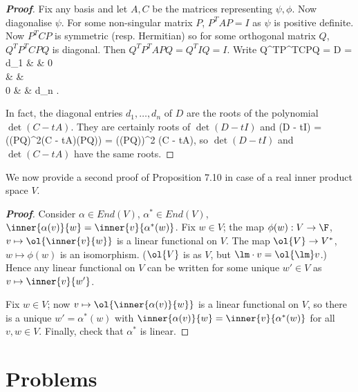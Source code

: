 \begin{proof}[\bf Proof]
Fix any basis and let $A,C$ be the matrices representing $\psi, \phi$. Now diagonalise $\psi$. For some non-singular matrix $P$, $P^TAP = I$ as $\psi$ is positive definite. Now $P^TCP$ is symmetric (resp. Hermitian) so for some orthogonal matrix $Q$, $Q^TP^TCPQ$ is diagonal. Then $Q^TP^TAPQ = Q^T IQ = I$. Write
\be
Q^TP^TCPQ = D = \bepm
d_1 & & 0\\
& \ddots &\\
0 & & d_n
\eepm.
\ee

In fact, the diagonal entries $d_1, \dots, d_n$ of $D$ are the roots of the polynomial $\det(C -tA)$. They are certainly roots of $\det(D - tI)$ and 
\be
\det(D - tI) = \det((PQ)^2(C - tA)(PQ)) = (\det(PQ))^2 \det(C - tA),
\ee
so $\det(D - tI)$ and $\det(C - tA)$ have the same roots.
\end{proof}

We now provide a second proof of Proposition 7.10 in case of a real inner product space $V$.

\begin{proof}[\bf Proof]
Consider $\alpha \in End(V )$, $\alpha^* \in End(V )$, $\inner{\alpha(v)}{w} = \inner{v}{\alpha^*(w)}$. Fix $w \in V$; the map $\phi(w) : V \to \F$, $v \mapsto \ol{\inner{v}{w}}$ is a linear functional on $V$. The map $\ol{V} \to V^*$, $w \mapsto \phi(w)$ is an isomorphism. ($\ol{V}$ is as $V$, but $\lm \cdot v = \ol{\lm}v$.) Hence any linear functional on $V$ can be written for some unique $w' \in V$ as $v\mapsto \inner{v}{w'}$.

Fix $w \in V$; now $v \mapsto \ol{\inner{\alpha(v)}{w}}$ is a linear functional on $V$, so there is a unique $w' = \alpha^*(w)$ with $\inner{\alpha(v)}{w}= \inner{v}{\alpha^*(w)}$ for all $v,w \in V$. Finally, check that $\alpha^*$ is linear.
\end{proof}


\section{Problems}

